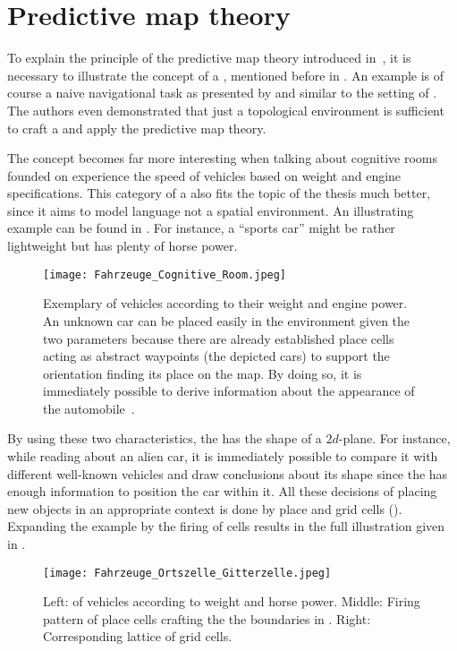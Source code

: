 \section{Predictive map theory} \label{sec: predictive map theory}
To explain the principle of the predictive map theory introduced in~\cite{StBoGe17HPM}, it is necessary to illustrate the concept of a \cognitiveroom{}, mentioned before in . An example is of course a naive navigational task as presented by  and similar to the setting of \figref{\ref{fig: Rat in maze}}. The authors even demonstrated that just a topological environment is sufficient to craft a \cognitiveroom{} and apply the predictive map theory.

The concept becomes far more interesting when talking about cognitive rooms founded on experience \ie the speed of vehicles based on weight and engine specifications. This category of a \cognitiveroom{} also fits the topic of the thesis much better, since it aims to model language not a spatial environment. An illustrating example can be found in \figref{\ref{fig: vehicles cognitive room}}. For instance, a ``sports car'' might be rather lightweight but has plenty of horse power.
\begin{figure}
	\centering
		\texttt{[image: Fahrzeuge\_Cognitive\_Room.jpeg]}
	\caption{Exemplary \cognitiveroom{} of vehicles according to their weight and engine power. An unknown car can be placed easily in the environment given the two parameters because there are already established place cells acting as abstract waypoints (the depicted cars) to support the orientation \ie finding its place on the map. By doing so, it is immediately possible to derive information about the appearance of the automobile~\cite{BellmundEtAl18NC}.}
	\label{fig: vehicles cognitive room}
\end{figure}
By using these two characteristics, the \cognitiveroom{} has the shape of a $ 2d $-plane. For instance, while reading about an alien car, it is immediately possible to compare it with different well-known vehicles and draw conclusions about its shape since the \cognitiveroom{} has enough information to position the car within it. All these decisions of placing new objects in an appropriate context is done by place and grid cells (). Expanding the example by the firing of cells results in the full illustration given in \figref{\ref{fig: vehicles with place and grid cells}}.
\begin{figure}
	\centering
		\texttt{[image: Fahrzeuge\_Ortszelle\_Gitterzelle.jpeg]}
	\caption{Left: \cognitiveroom{} of vehicles according to weight and horse power. Middle: Firing pattern of place cells crafting the \cognitiveroom{} \ie the boundaries in \figref{\ref{fig: vehicles cognitive room}}. Right: Corresponding lattice of grid cells.~\cite{BellmundEtAl18NC}}
	\label{fig: vehicles with place and grid cells}
\end{figure}

